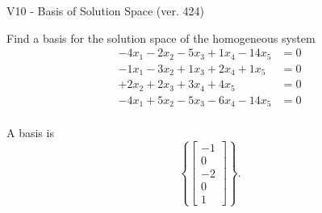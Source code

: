 \begin{exercise}
  \begin{exerciseTitle}V10 - Basis of Solution Space (ver. 424)\end{exerciseTitle}
  \begin{exerciseStatement}
    Find a basis for the solution space of the homogeneous system 
\begin{align*}
 -4 x_ 1 -2 x_ 2 -5 x_ 3 + 1 x_ 4 -14 x_ 5 &= 0  \\ 
  -1 x_ 1 -3 x_ 2 + 1 x_ 3 + 2 x_ 4 + 1 x_ 5 &= 0  \\ 
  + 2 x_ 2 + 2 x_ 3 + 3 x_ 4 + 4 x_ 5 &= 0  \\ 
  -4 x_ 1 + 5 x_ 2 -5 x_ 3 -6 x_ 4 -14 x_ 5 &= 0  \\ 
 \end{align*}


 
  \end{exerciseStatement}

  \begin{exerciseAnswer}
   A basis is   
\[\left\{\left[\begin{array}{c}
-1 \\
0 \\
-2 \\
0 \\
1
\end{array}\right]\right\}.\]

  


  \end{exerciseAnswer}
\end{exercise}